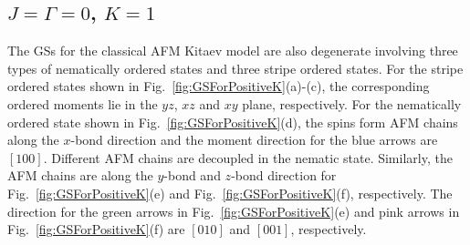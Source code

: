 \documentclass[aps,prb,reprint,amsfonts,amsmath,amssymb,showpacs,groupedaddress,superscriptaddress]{revtex4-1}
\begin{document}
\subsection{$J=\Gamma=0$, $K=1$}

The GSs for the classical AFM Kitaev model are also degenerate involving three types of nematically ordered states and three stripe ordered states. For the stripe ordered states shown in Fig.~\ref{fig:GSForPositiveK}(a)-(c), the corresponding ordered moments lie in the $yz$, $xz$ and $xy$ plane, respectively. For the nematically ordered state shown in Fig.~\ref{fig:GSForPositiveK}(d), the spins form AFM chains along the $x$-bond direction and the moment direction for the blue arrows are $[100]$. Different AFM chains are decoupled in the nematic state. Similarly, the AFM chains are along the $y$-bond and $z$-bond direction for Fig.~\ref{fig:GSForPositiveK}(e) and Fig.~\ref{fig:GSForPositiveK}(f), respectively. The direction for the green arrows in Fig.~\ref{fig:GSForPositiveK}(e) and pink arrows in Fig.~\ref{fig:GSForPositiveK}(f) are $[010]$ and $[001]$, respectively.


\end{document}

